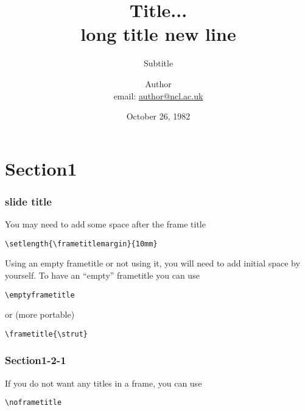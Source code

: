 \documentclass[slidestop,compress,9pt]{beamer}
\title[Shorttitle]{\textbf{Title... \\ long title new line}}
\subtitle{Subtitle}
\author[Shortauthor]{Author \\ \small email: \href{mailto:author@ncl.ac.uk}{author@ncl.ac.uk}}
\institute{Newcastle University}
\date[Oct 26]{October 26, 1982}
\begin{document}
\begin{frame}[plain]
\maketitle
\end{frame}



\begin{frame}
\tableofcontents
\end{frame}



\section{Section1}
\begin{frame}[fragile]
\frametitle{slide title}
You may need to add some space after the frame title
\begin{lstlisting}
\setlength{\frametitlemargin}{10mm}
\end{lstlisting}

\pause
\vskip 3mm
Using an empty frametitle or not using it, you will need to add initial space by yourself.
To have an ``empty'' frametitle you can use
\begin{lstlisting}
\emptyframetitle
\end{lstlisting}

\pause
or (more portable)
\begin{lstlisting}
\frametitle{\strut}
\end{lstlisting}
\end{frame}

\subsubsection{Section1-2-1}
\begin{frame}[fragile]
\noframetitle
If you do not want any titles in a frame, you can use
\begin{lstlisting}
\noframetitle
\end{lstlisting}
\end{frame}
\end{document}
